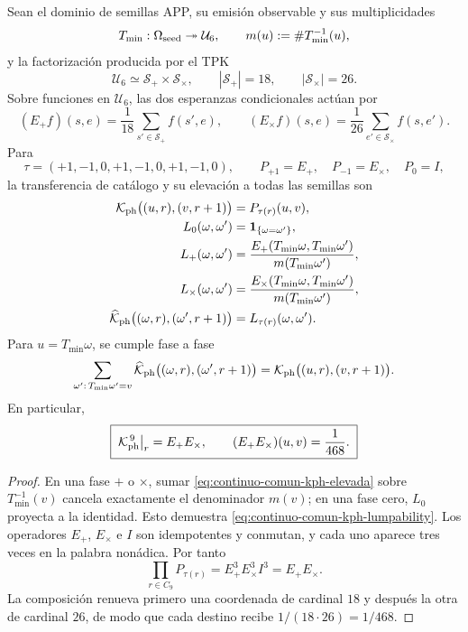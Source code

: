 \begin{proposition}
\label{prop:continuo-comun-kph-heredada}
\label{pII-full:thm:seleccion-novena-fase}
Sean el dominio de semillas APP, su emisión observable y sus multiplicidades
\[
 T_{\min}:\Omega_{\rm seed}\twoheadrightarrow\mathcal U_6,
 \qquad
 m(u):=\#T_{\min}^{-1}(u),
\]
y la factorización producida por el TPK
\[
 \mathcal U_6\simeq\mathcal S_+\times\mathcal S_\times,
 \qquad |\mathcal S_+|=18,\qquad |\mathcal S_\times|=26.
\]
Sobre funciones en \(\mathcal U_6\), las dos esperanzas condicionales actúan
por
\[
 (E_+f)(s,e)=\frac1{18}\sum_{s'\in\mathcal S_+}f(s',e),
 \qquad
 (E_\times f)(s,e)=\frac1{26}
 \sum_{e'\in\mathcal S_\times}f(s,e').
\]
Para
\[
 \tau=(+1,-1,0,+1,-1,0,+1,-1,0),
 \qquad
 P_{+1}=E_+,\quad P_{-1}=E_\times,\quad P_0=I,
\]
la transferencia de catálogo y su elevación a todas las semillas son
\begin{align}
 \mathcal K_{\rm ph}\bigl((u,r),(v,r+1)\bigr)
 &=P_{\tau(r)}(u,v),
 \label{eq:continuo-comun-kph-catalogo}\\
 L_0(\omega,\omega')&=\mathbf1_{\{\omega=\omega'\}},\nonumber\\
 L_+(\omega,\omega')
 &=\frac{E_+(T_{\min}\omega,T_{\min}\omega')}
         {m(T_{\min}\omega')},\nonumber\\
 L_\times(\omega,\omega')
 &=\frac{E_\times(T_{\min}\omega,T_{\min}\omega')}
         {m(T_{\min}\omega')},\nonumber\\
 \widehat{\mathcal K}_{\rm ph}
 \bigl((\omega,r),(\omega',r+1)\bigr)
 &=L_{\tau(r)}(\omega,\omega').
 \label{eq:continuo-comun-kph-elevada}
\end{align}
Para \(u=T_{\min}\omega\), se cumple fase a fase
\begin{equation}
\label{eq:continuo-comun-kph-lumpability}
 \sum_{\omega':\,T_{\min}\omega'=v}
 \widehat{\mathcal K}_{\rm ph}
 \bigl((\omega,r),(\omega',r+1)\bigr)
 =
 \mathcal K_{\rm ph}\bigl((u,r),(v,r+1)\bigr).
\end{equation}
En particular,
\begin{equation}
\label{eq:continuo-comun-kph-novena-potencia}
 \boxed{\;
 \mathcal K_{\rm ph}^{\,9}\big|_r=E_+E_\times,
 \qquad
 (E_+E_\times)(u,v)=\frac1{468}.
 \;}
\end{equation}
\end{proposition}

\begin{proof}
En una fase \(+\) o \(\times\), sumar
\eqref{eq:continuo-comun-kph-elevada} sobre
\(T_{\min}^{-1}(v)\) cancela exactamente el denominador \(m(v)\); en una
fase cero, \(L_0\) proyecta a la identidad. Esto demuestra
\eqref{eq:continuo-comun-kph-lumpability}. Los operadores \(E_+\),
\(E_\times\) e \(I\) son idempotentes y conmutan, y cada uno aparece tres
veces en la palabra nonádica. Por tanto
\[
 \prod_{r\in C_9}P_{\tau(r)}
 =E_+^3E_\times^3I^3=E_+E_\times.
\]
La composición renueva primero una coordenada de cardinal \(18\) y después
la otra de cardinal \(26\), de modo que cada destino recibe
\(1/(18\cdot26)=1/468\).
\end{proof}

